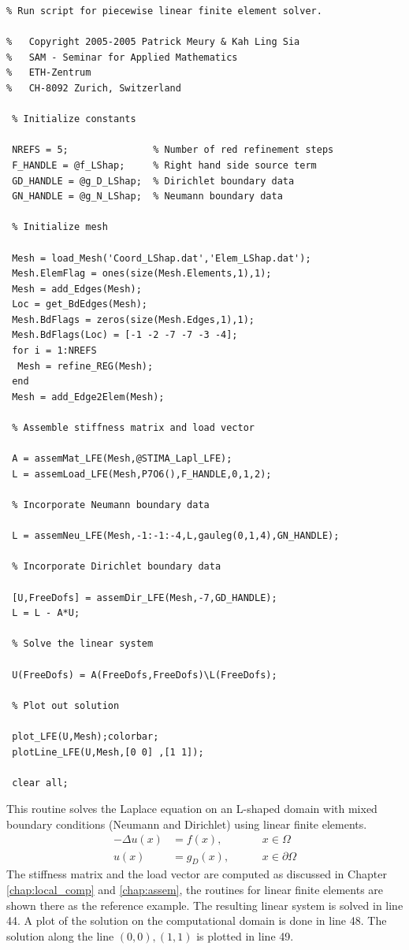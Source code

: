 \begin{lstlisting}
% Run script for piecewise linear finite element solver.

%   Copyright 2005-2005 Patrick Meury & Kah Ling Sia
%   SAM - Seminar for Applied Mathematics
%   ETH-Zentrum
%   CH-8092 Zurich, Switzerland
  
 % Initialize constants
   
 NREFS = 5;               % Number of red refinement steps
 F_HANDLE = @f_LShap;     % Right hand side source term
 GD_HANDLE = @g_D_LShap;  % Dirichlet boundary data
 GN_HANDLE = @g_N_LShap;  % Neumann boundary data
 
 % Initialize mesh
  
 Mesh = load_Mesh('Coord_LShap.dat','Elem_LShap.dat'); 
 Mesh.ElemFlag = ones(size(Mesh.Elements,1),1);         
 Mesh = add_Edges(Mesh);                                
 Loc = get_BdEdges(Mesh);
 Mesh.BdFlags = zeros(size(Mesh.Edges,1),1); 
 Mesh.BdFlags(Loc) = [-1 -2 -7 -7 -3 -4];
 for i = 1:NREFS
  Mesh = refine_REG(Mesh);     
 end
 Mesh = add_Edge2Elem(Mesh);
  
 % Assemble stiffness matrix and load vector
 
 A = assemMat_LFE(Mesh,@STIMA_Lapl_LFE);
 L = assemLoad_LFE(Mesh,P7O6(),F_HANDLE,0,1,2);
   
 % Incorporate Neumann boundary data
  
 L = assemNeu_LFE(Mesh,-1:-1:-4,L,gauleg(0,1,4),GN_HANDLE);
  
 % Incorporate Dirichlet boundary data
 
 [U,FreeDofs] = assemDir_LFE(Mesh,-7,GD_HANDLE);
 L = L - A*U;
  
 % Solve the linear system
 
 U(FreeDofs) = A(FreeDofs,FreeDofs)\L(FreeDofs);
    
 % Plot out solution
    
 plot_LFE(U,Mesh);colorbar;
 plotLine_LFE(U,Mesh,[0 0] ,[1 1]);
   
 clear all;
\end{lstlisting}

This routine solves the Laplace equation on an L-shaped domain with mixed boundary conditions (Neumann and Dirichlet) using linear finite elements.
\begin{align*}
 -\Delta u(x) &= f(x), \qquad && x\in \Omega \\
 u(x) &= g_D(x), && x \in \partial \Omega
\end{align*}
The stiffness matrix and the load vector are computed as discussed in Chapter \ref{chap:local_comp} and \ref{chap:assem}, the routines for linear finite elements are shown there as the reference example. The resulting linear system is solved in line 44. A plot of the solution on the computational domain is done in line 48. The solution along the line $(0,0),(1,1)$ is plotted in line 49.

